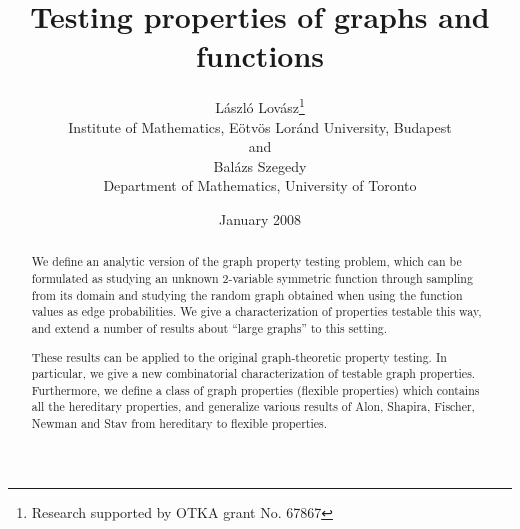 \documentclass{article}
\begin{document}
\addtolength{\baselineskip}{3pt} \setlength{\oddsidemargin}{0.2in}

\def\N{{\mathbb N}}
\def\R{{\mathbb R}}
\def\one{{\mathbf 1}}
\def\Q{{\mathbb Q}}
\def\Z{{\mathbb Z}}
\def\C{{\mathbb C}}
\def\hom{{\rm hom}}
\def\Hom{{\rm Hom}}
\def\Inj{{\rm Inj}}
\def\Ind{{\rm Ind}}
\def\inj{{\rm inj}}
\def\ind{{\rm ind}}
\def\sur{{\rm sur}}
\def\PAG{{\rm PAG}}
\def\eps{\varepsilon}
\def\Ge{{\mathbb G}}
\def\Ha{{\mathbb H}}
\def\CUT{\text{\rm CUT}}
\def\IO{{\infty\to1}}
\def\GR{\text{\rm GR}}
\def\irreg{\text{\rm irreg}}

\def\sto{\stackrel\square\longrightarrow}
\def\sign{\hbox{\rm sgn}}

\def\proofend{\hfill$\square$\medskip}
\def\Proof{\noindent{\bf Proof. }}


\def\AA{\mathcal{A}}\def\BB{\mathcal{B}}\def\CC{\mathcal{C}}\def\DD{\mathcal{D}}\def\EE{\mathcal{E}}\def\FF{\mathcal{F}}
\def\GG{\mathcal{G}}\def\HH{\mathcal{H}}\def\II{\mathcal{I}}\def\JJ{\mathcal{J}}\def\KK{\mathcal{K}}\def\LL{\mathcal{L}}
\def\MM{\mathcal{M}}\def\NN{\mathcal{N}}\def\OO{\mathcal{O}}\def\PP{\mathcal{P}}\def\QQ{\mathcal{Q}}\def\RR{\mathcal{R}}
\def\SS{\mathcal{S}}\def\TT{\mathcal{T}}\def\UU{\mathcal{U}}\def\VV{\mathcal{V}}\def\WW{\mathcal{W}}\def\XX{\mathcal{X}}
\def\YY{\mathcal{Y}}\def\ZZ{\mathcal{Z}}

\def\Pr{{\sf P}}
\def\E{{\sf E}}
\def\Var{{\sf Var}}
\def\T{^{\sf T}}


\title{Testing properties of graphs and functions}
\date{January 2008}
\author{{\sc L\'aszl\'o Lov\'asz}\footnote{Research supported by OTKA grant No. 67867}\\
Institute of Mathematics, E\"otv\"os Lor\'and University, Budapest\\ and\\
{\sc Bal\'azs Szegedy}\\ Department of Mathematics, University of
Toronto}

\maketitle

\tableofcontents

\bigskip\goodbreak

\begin{abstract}
We define an analytic version of the graph property testing problem,
which can be formulated as studying an unknown 2-variable symmetric
function through sampling from its domain and studying the random
graph obtained when using the function values as edge probabilities.
We give a characterization of properties testable this way, and
extend a number of results about ``large graphs'' to this setting.

These results can be applied to the original graph-theoretic property
testing. In particular, we give a new combinatorial characterization
of testable graph properties. Furthermore, we define a class of graph
properties (flexible properties) which contains all the hereditary
properties, and generalize various results of Alon, Shapira, Fischer,
Newman and Stav from hereditary to flexible properties.
\end{abstract}
\end{document}

